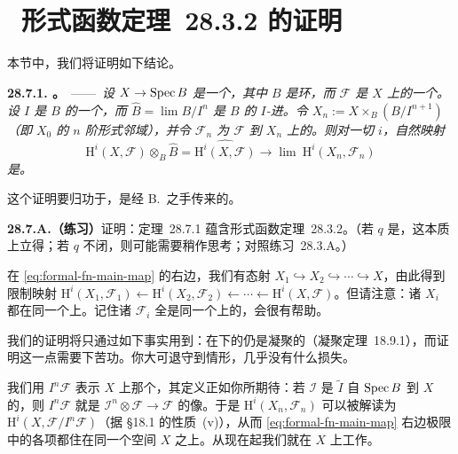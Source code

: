
\section{\extrahard\ 形式函数定理~28.3.2 的证明}

本节中，我们将证明如下结论。

\textbf{28.7.1. \trhTheorem。}\ ——\ \emph{设 $X\to\operatorname{Spec} B$ 是一个\trProper\trMorphism，其中 $B$ 是\trNoether{}环，而 $\mathscr{F}$ 是 $X$ 上的一个\trCoherentSheaf。设 $I$ 是 $B$ 的一个\trIdeal，而 $\hat{B}=\lim B/I^n$ 是 $B$ 的 $I$-进\trCompletion。令 $X_n:=X\times_B(B/I^{n+1})$（即\trFiber{} $X_0$ 的 $n$ 阶形式邻域），并令 $\mathscr{F}_n$ 为 $\mathscr{F}$ 到 $X_n$ 上的\trPullback。则对一切 $i$，自然映射
\begin{equation*}
\tag{28.7.1.1}\label{eq:formal-fn-main-map}
\mathrm{H}^i(X,\mathscr{F})\otimes_B\hat{B}=\widehat{\mathrm{H}^i(X,\mathscr{F})}\longrightarrow\lim\ \mathrm{H}^i(X_n,\mathscr{F}_n)
\end{equation*}
是\trIsomorphism。}

这个证明要归功于\trSerre，是经 B.~\trConrad{}之手传来的。

\textbf{28.7.A.（练习）}\quad 证明：\mbox{定理~28.7.1} 蕴含\mbox{形式函数定理~28.3.2}。（若 $q$ 是\trClosedPoint，这本质上立得；若 $q$ 不闭，则可能需要稍作思考；对照\mbox{练习~28.3.A}。）

在 \eqref{eq:formal-fn-main-map} 的右边，我们有态射 $X_1\hookrightarrow X_2\hookrightarrow\cdots\hookrightarrow X$，由此得到限制映射 $\mathrm{H}^i(X_1,\mathscr{F}_1)\leftarrow\mathrm{H}^i(X_2,\mathscr{F}_2)\leftarrow\cdots\leftarrow\mathrm{H}^i(X,\mathscr{F})$。但请注意：诸 $X_i$ 都\trSupport{}在同一个\trUnderlyingSet{}上。记住诸 $\mathscr{F}_i$ 全是同一个\trTopologicalSpace{}上的\trSheaf，会很有帮助。

我们的证明将只通过如下事实用到\trProperness：\trCoherentSheaf{}在\trProper\trMorphism{}下的\trPushforward{}仍是凝聚的（\mbox{\trGrothendieck{}凝聚定理~18.9.1}），而证明这一点需要下苦功。你大可退守到\trProjective{}情形，几乎没有什么损失。

我们用 $I^n\mathscr{F}$ 表示 $X$ 上那个\trCoherentSheaf，其定义正如你所期待：若 $\mathscr{I}$ 是 $\tilde{I}$ 自 $\operatorname{Spec} B$ 到 $X$ 的\trPullback，则 $I^n\mathscr{F}$ 就是 $\mathscr{I}^n\otimes\mathscr{F}\to\mathscr{F}$ 的像。于是 $\mathrm{H}^i(X_n,\mathscr{F}_n)$ 可以被解读为 $\mathrm{H}^i(X,\mathscr{F}/I^n\mathscr{F})$（据 \S18.1 的性质~(v)），从而 \eqref{eq:formal-fn-main-map} 右边极限中的各项都住在同一个空间 $X$ 之上。从现在起我们就在 $X$ 上工作。

